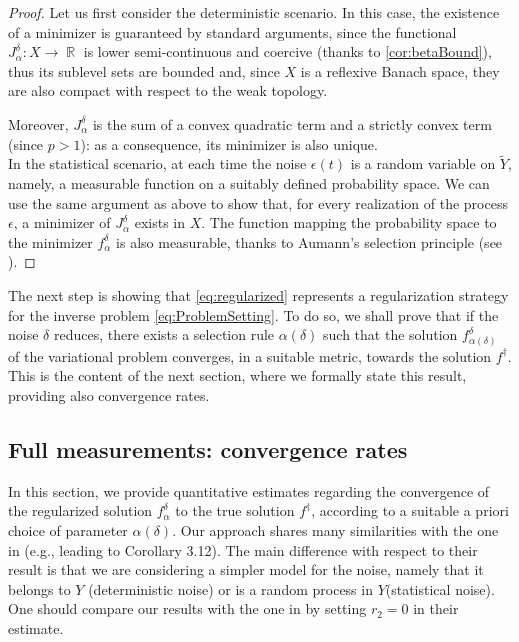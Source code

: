 \documentclass[11pt,a4paper]{article}
\numberwithin{equation}{section}
\DeclareMathOperator{\R}{\mathbb{R}}
\def\fda{f^\delta_{\alpha}}
\def\Jda{J^\delta_{\alpha}}
\begin{document}
\begin{proof}
Let us first consider the deterministic scenario. In this case, the existence of a minimizer is guaranteed by standard arguments, since the functional $\Jda \colon X \rightarrow \R$ is lower semi-continuous and coercive (thanks to \cref{cor:betaBound}), thus its sublevel sets are bounded and, since $X$ is a reflexive Banach space, they are also compact with respect to the weak topology.

Moreover, $\Jda$ is the sum of a convex quadratic term and a strictly convex term (since $p>1$): as a consequence, its minimizer is also unique. \\
In the statistical scenario, at each time the noise $\epsilon(t)$ is a random variable on $\tilde{Y}$, namely, a measurable function on a suitably defined probability space. We can use the same argument as above to show that, for every realization of the process $\epsilon$, a minimizer of $\Jda$ exists in $X$. The function mapping the probability space to the minimizer $\fda$ is also measurable, thanks to Aumann's selection principle (see \cite[Lemma A.3.18]{steinwart2008support}).
\end{proof}

The next step is showing that \eqref{eq:regularized} represents a regularization strategy for the inverse problem \eqref{eq:ProblemSetting}. To do so, we shall prove that if the noise $\delta$ reduces, there exists a selection rule $\alpha(\delta)$ such that the solution $f^\delta_{\alpha(\delta)}$ of the variational problem converges, in a suitable metric, towards the solution $f^\dag$. This is the content of the next section, where we formally state this result, providing also convergence rates.


\subsection{Full measurements: convergence rates}
\label{ssec:nonsampled}

In this section, we provide quantitative estimates regarding the convergence of the regularized solution $\fda$ to the true solution $f^\dag$, according to a suitable a priori choice of parameter $\alpha(\delta)$. Our approach shares many similarities with the one in \cite{burger2018large} (e.g., leading to Corollary 3.12). The main difference with respect to their result is that we are considering a simpler model for the noise, namely that it belongs to $Y$ (deterministic noise) or is a random process in $Y$(statistical noise). One should compare our results with the one in \cite[Corollary 3.12]{burger2018large} by setting $r_2 = 0$ in their estimate.
\end{document}
